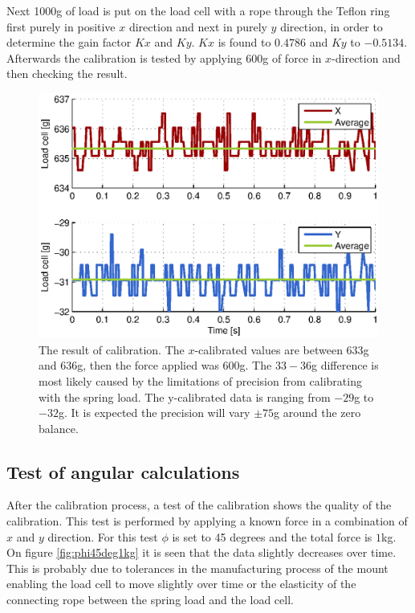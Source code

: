 \noindent
Next 1000g of load is put on the load cell with a rope through the Teflon ring first purely in positive $x$ direction and next in purely $y$ direction, in order to determine the gain factor $Kx$ and $Ky$. $Kx$ is found to $0.4786$ and $Ky$ to $-0.5134$. Afterwards the calibration is tested by applying $600$g of force in $x$-direction and then checking the result.

\begin{figure}[hbtp]
\centering
\includegraphics[scale=1]{graphics/gcs_test/calib_result_compare.eps}
\caption[Result of calibration for Horizontal Measurement Device]{The result of calibration. The $x$-calibrated values are between $633$g and $636$g, then the force applied was $600$g. The $33-36$g difference is most likely caused by the limitations of precision from calibrating with the spring load. The y-calibrated data is ranging from $-29$g to $-32$g. It is expected the precision will vary $\pm75$g around the zero balance.}
\end{figure}

\newpage
\subsection{Test of angular calculations}
After the calibration process, a test of the calibration shows the quality of the calibration.
This test is performed by applying a known force in a combination of $x$ and $y$ direction. For this test $\phi$ is set to 45 degrees and the total force is $1$kg. On figure \ref{fig:phi45deg1kg} it is seen that the data slightly decreases over time. This is probably due to tolerances in the manufacturing process of the mount enabling the load cell to move slightly over time or the elasticity of the connecting rope between the spring load and the load cell.

